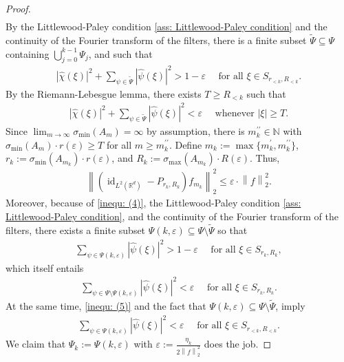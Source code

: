 \documentclass[10pt,a4paper]{amsart}
\newcommand{\N}{\mathbb{N}}
\newcommand{\R}{{\mathbb{R}}}
\DeclareMathOperator{\id}{id}
\newcommand{\norm}[1]{\ensuremath{\left\lVert\text{}#1\text{}\right\rVert}}
\begin{document}
\begin{proof}
\begin{align*}
    \end{align*}
    By the Littlewood-Paley condition \eqref{ass: Littlewood-Paley condition} and the continuity of the Fourier transform of the filters, there is a finite subset $\widetilde{\Psi}\subseteq \Psi$ containing $\bigcup_{j=0}^{k-1}\Psi_j$, and such that
    \begin{align}\label{inequ: (5)}
      |\widehat{\chi}(\xi)|^2+\sum_{\psi \in \widetilde{\Psi}}|\widehat{\psi}(\xi)|^2 > 1-\varepsilon \quad \text{ for all } \xi \in S_{r_{<k},R_{<k}}.
    \end{align} 
    By the Riemann-Lebesgue lemma, there exists $T\geq R_{<k}$ such that
    \begin{align}\label{inequ: (4)}
      |\widehat{\chi}(\xi)|^2+\sum_{\psi \in \widetilde{\Psi}}|\widehat{\psi}(\xi)|^2 < \varepsilon \quad \text{ whenever } |\xi| \geq T.
    \end{align}
    Since $\lim_{m \to \infty}\sigma_{\text{min}}\left(A_{m}\right)=\infty$ by assumption, there is $m_k^{\prime\prime}\in \N$ with $\sigma_{\text{min}}(A_{m}) \cdot r(\varepsilon)\geq T$ for all $m \geq m_k^{\prime\prime}$.
    Define $m_k:=\max\{m_k^\prime,m_k^{\prime\prime}\}$, $r_k:=\sigma_{\text{min}}(A_{m_k}) \cdot r(\varepsilon)$, and $R_k:=\sigma_{\text{max}}(A_{m_k}) \cdot R(\varepsilon)$. Thus,
    \begin{align*}
      \norm{(\id_{L^2(\R^d)}-P_{r_{k},R_{k}})f_{m_k}}_2^2 \leq \varepsilon \cdot \norm{f}_2^2.
    \end{align*}
    Moreover, because of \eqref{inequ: (4)}, the Littlewood-Paley condition \eqref{ass: Littlewood-Paley condition}, and the continuity of the Fourier transform of the filters, there exists a finite subset $\Psi(k,\varepsilon)\subseteq \Psi \setminus \widetilde{\Psi}$ so that
    \begin{align*}
      \sum_{\psi \in \Psi(k,\varepsilon)}|\widehat{\psi}(\xi)|^2 > 1-\varepsilon \quad \text{ for all } \xi \in S_{r_k,R_k},
    \end{align*}
    which itself entails
    \begin{align}\label{inequ: (7)}
      \sum_{\psi \in \Psi \setminus \Psi(k,\varepsilon)}|\widehat{\psi}(\xi)|^2 < \varepsilon \quad \text{ for all } \xi \in S_{r_k,R_k}.
    \end{align}
    At the same time, \eqref{inequ: (5)} and the fact that $\Psi(k,\varepsilon)\subseteq \Psi \setminus \widetilde{\Psi}$, imply
    \begin{align}\label{inequ: (6)}
      \sum_{\psi \in \Psi(k,\varepsilon)}|\widehat{\psi}(\xi)|^2 < \varepsilon \quad \text{ for all } \xi \in S_{r_{<k},R_{<k}}.
    \end{align}
    We claim that $\Psi_k:=\Psi(k,\varepsilon)$ with $\varepsilon:=\frac{\eta_k}{2\norm{f}_2^2}$ does the job. 
  

\end{proof}
\end{document}
